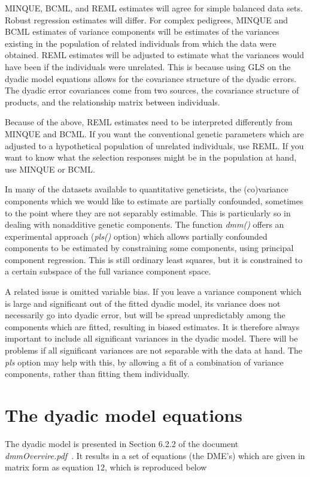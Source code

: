 \documentclass[titlepage,a4paper,12pt]{article}  %
\begin{document}
MINQUE, BCML, and REML estimates will agree for simple balanced data sets. Robust regression estimates will differ. For complex pedigrees, MINQUE and BCML estimates of variance components will be estimates of the variances existing in the population of related individuals from which the data were obtained. REML estimates will be adjusted to estimate what the variances would have been if the individuals were unrelated. This is because using GLS on the dyadic model equations allows for the covariance structure of the dyadic errors. The dyadic error covariances come from two sources, the covariance structure of products, and the relationship matrix between individuals. 

Because of the above, REML estimates need to be interpreted differently from MINQUE and BCML. If you want the conventional genetic parameters which are adjusted to a hypothetical population of unrelated individuals, use REML. If you want to know what the selection responses might be in the population at hand, use MINQUE or BCML. 

  In many of the datasets available to quantitative geneticists, the (co)variance components which we would like to estimate are partially confounded, sometimes to the point where they  are not separably estimable. This is particularly so in dealing with nonadditive genetic components. The function {\em dmm()} offers an experimental approach ({\em pls()} option) which allows partially confounded components to be estimated by constraining some components, using principal component regression. This is still ordinary least squares, but it is constrained to a certain subspace of the full variance component space.

  A related issue is omitted variable bias. If you leave a variance component which is large and significant out of the fitted dyadic model, its variance does not necessarily go into dyadic error, but will be spread unpredictably among the components which are fitted, resulting in biased estimates. It is therefore always important to include all significant variances in the dyadic model. There will be problems if all significant variances are not separable with the data at hand. The {\em pls} option may help with this, by allowing a fit of a combination of variance components, rather than fitting them individually.
 
\section{The dyadic model equations}
The dyadic model is presented in Section 6.2.2  of the document {\em dmmOvervire.pdf}~\cite{jack:15}. It results in a set of equations (the DME's) which are given in matrix form as equation 12, which is reproduced below
\end{document}
